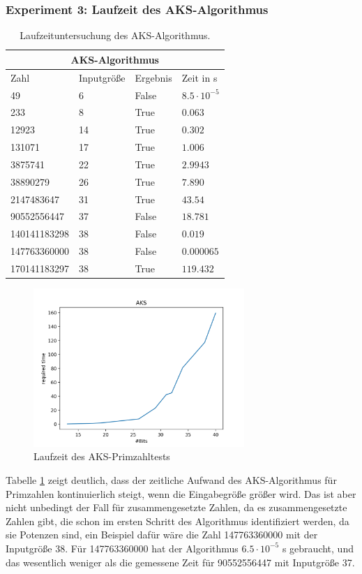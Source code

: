 \documentclass[12pt,oneside]{article}
\theoremstyle{remark}
\theoremstyle{definition}
\begin{document}
\newpage

\subsubsection{Experiment 3: Laufzeit des AKS-Algorithmus}
\begin{table}[h!]
\centering
\begin{tabular}{ |p{3cm}||p{3cm}|p{3cm}|p{3cm}|  }
 \hline
 \multicolumn{4}{|c|}{AKS-Algorithmus} \\
 \hline
 Zahl & Inputgröße &Ergebnis&Zeit in s\\
 \hline
 49   & 6    &False&   $8.5 \cdot 10^{-5}$\\
 233&   8  & True   &$0.063$\\
 12923 &14 & True&  $0.302$\\
 131071    &17 & True&  $1.006$\\
 3875741& 22  & True   &$2.9943$\\
 38890279& 26  & True& $7.890$\\
 2147483647&   31  & True& $43.54$\\
 90552556447&   37  & False& $18.781$\\
 140141183298&   38  & False& $0.019$\\
 147763360000&   38  & False& $0.000065$\\
 170141183297& 38 & True& $119.432$\\
 \hline
\end{tabular}
 \caption{Laufzeituntersuchung des AKS-Algorithmus.}
\label{table:3}
\end{table}

\begin{figure}[h]
\includegraphics[width=8cm]{plots/aks.png}
\centering
\caption{Laufzeit des AKS-Primzahltests}
\end{figure}


Tabelle \ref{table:3} zeigt deutlich, dass der zeitliche Aufwand des AKS-Algorithmus für Primzahlen kontinuierlich steigt, wenn die Eingabegröße größer wird. Das ist aber nicht unbedingt der Fall für zusammengesetzte Zahlen, da es zusammengesetzte Zahlen gibt, die schon im ersten Schritt des Algorithmus identifiziert werden, da sie Potenzen sind, ein Beispiel dafür wäre die Zahl 147763360000 mit der Inputgröße 38. Für 147763360000 hat der Algorithmus $6.5 \cdot 10^{-5}$ s gebraucht, und das wesentlich weniger als die gemessene Zeit für 90552556447 mit Inputgröße 37.
\end{document}

